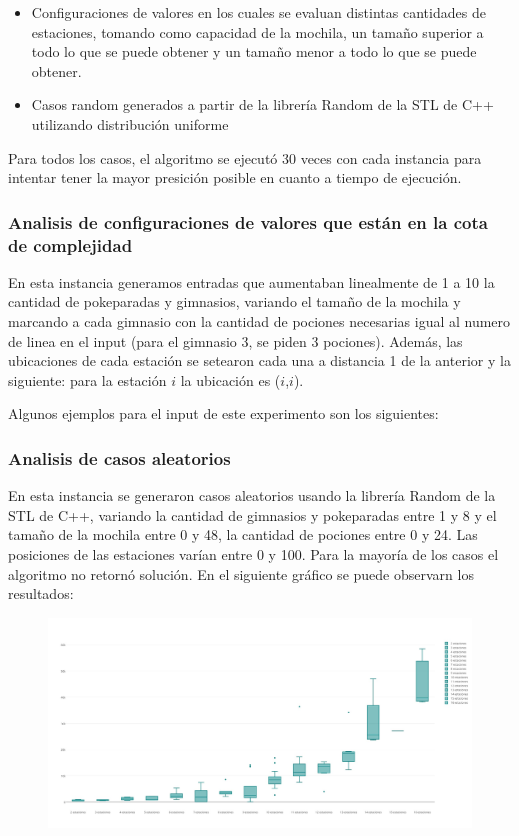       \begin{itemize}
        \item Configuraciones de valores en los cuales se evaluan distintas cantidades de estaciones, tomando como capacidad de la mochila, un tamaño superior a todo lo que se puede obtener y un tamaño menor a todo lo que se puede obtener.
        \item Casos random generados a partir de la librería Random de la STL de C++ utilizando distribución uniforme
      \end{itemize}

      Para todos los casos, el algoritmo se ejecutó 30 veces con cada instancia para intentar tener la mayor presición posible en cuanto a tiempo de ejecución.

      \subsubsection{Analisis de configuraciones de valores que están en la cota de complejidad}
      En esta instancia generamos entradas que aumentaban linealmente de 1 a 10 la cantidad de pokeparadas y gimnasios, variando el tamaño de la mochila y marcando a cada gimnasio con la cantidad de pociones necesarias igual al numero de linea en el input (para el gimnasio 3, se piden 3 pociones). Además, las ubicaciones de cada estación se setearon cada una a distancia 1 de la anterior y la siguiente: para la estación $i$ la ubicación es ($i$,$i$).

      Algunos ejemplos para el input de este experimento son los siguientes:

      \subsubsection{Analisis de casos aleatorios}
      En esta instancia se generaron casos aleatorios usando la librería Random de la STL de C++, variando la cantidad de gimnasios y pokeparadas entre 1 y 8 y el tamaño de la mochila entre 0 y 48, la cantidad de pociones entre 0 y 24. Las posiciones de las estaciones varían entre 0 y 100. Para la mayoría de los casos el algoritmo no retornó solución.
      En el siguiente gráfico se puede observarn los resultados:

      \begin{figure}[H]
      \begin{center}
        \includegraphics[width=1.0\columnwidth]{imagenes/exp_random_ej2.jpeg}
        \caption{}
      \end{center}
  \end{figure}


